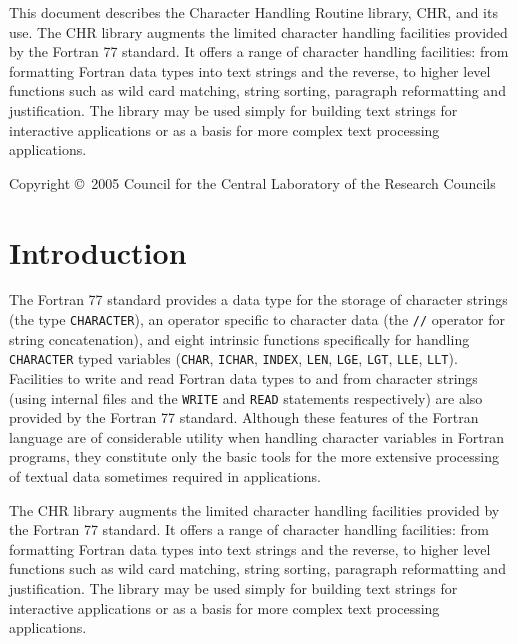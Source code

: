 \documentclass[twoside,11pt]{article}
\newcommand{\stardocinitials}  {SUN}
\newcommand{\stardoccopyright} 
{Copyright \copyright\ 2005 Council for the Central Laboratory of the Research Councils}
\newcommand{\stardocnumber}    {40.6}
\newcommand{\stardocabstract}  {
This document describes the Character Handling Routine library, CHR, 
and its use.
The CHR library augments the limited character handling facilities
provided by the Fortran 77 standard.
It offers a range of character handling facilities: from formatting
Fortran data types into text strings and the reverse, to higher level
functions such as wild card matching, string sorting, paragraph
reformatting and justification. 
The library may be used simply for building text strings for interactive
applications or as a basis for more complex text processing applications.
}
\newcommand{\stardocname}{\stardocinitials /\stardocnumber}
\newenvironment{latexonly}{}{}
\renewcommand{\_}{\texttt{\symbol{95}}}
\renewcommand{\thepage}{\roman{page}}
\begin{document}
\stardocabstract

\begin{latexonly}
\newpage
\vspace*{\fill}
\stardoccopyright
\end{latexonly}

  \newpage
  \begin{latexonly}
    \setlength{\parskip}{0mm}
    \tableofcontents
    \setlength{\parskip}{\medskipamount}
    \markboth{\stardocname}{\stardocname}
  \end{latexonly}

\cleardoublepage
\renewcommand{\thepage}{\arabic{page}}
\setcounter{page}{1}

\section {Introduction}

The Fortran 77 standard provides a data type for the storage of
character strings (the type {\tt CHARACTER}), an operator specific to 
character data (the {\tt //} operator for string concatenation), and 
eight intrinsic functions specifically for handling {\tt CHARACTER} typed
variables ({\tt CHAR}, {\tt ICHAR}, {\tt INDEX}, {\tt LEN}, {\tt LGE}, 
{\tt LGT}, {\tt LLE}, {\tt LLT}). 
Facilities to write and read Fortran data types to and from
character strings (using internal files and the {\tt WRITE} and {\tt READ} 
statements respectively) are also provided by the Fortran 77 standard.
Although these features of the Fortran language are of considerable utility
when handling character variables in Fortran programs, they constitute only the
basic tools for the more extensive processing of textual data sometimes 
required in applications.

The CHR library augments the limited character handling facilities
provided by the Fortran 77 standard.
It offers a range of character handling facilities: from formatting
Fortran data types into text strings and the reverse, to higher level
functions such as wild card matching, string sorting, paragraph
reformatting and justification. 
The library may be used simply for building text strings for interactive
applications or as a basis for more complex text processing applications.
\end{document}
